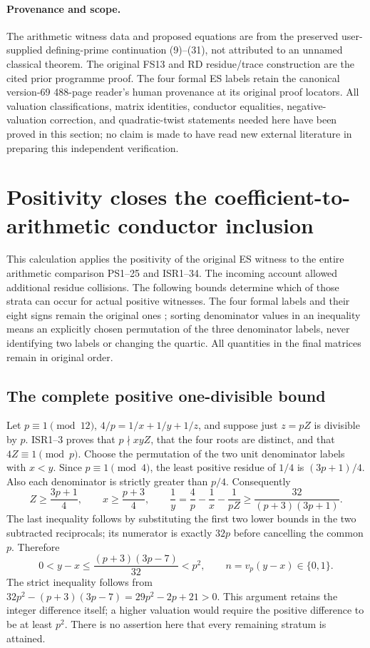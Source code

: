 \documentclass[11pt]{article}
\begin{document}
\paragraph{Provenance and scope.}
The arithmetic witness data and proposed equations are from the
preserved user-supplied defining-prime continuation (9)--(31), not
attributed to an unnamed classical theorem. The original FS13 and
RD residue/trace construction are the cited prior programme proof.
The four formal ES labels retain the canonical version-69 488-page
reader's human provenance at its original proof locators. All
valuation classifications, matrix identities, conductor equalities,
negative-valuation correction, and quadratic-twist statements needed
here have been proved in this section; no claim is made to have read
new external literature in preparing this independent verification.

\section{Positivity closes the coefficient-to-arithmetic conductor inclusion}
This calculation applies the positivity of the original ES witness to the
entire arithmetic comparison PS1--25 and ISR1--34. The incoming account
\cite[eqs.\ (9)--(23)]{DefiningPrimeReceived} allowed additional residue
collisions. The following bounds determine which of those strata can
occur for actual positive witnesses. The four formal labels and their
eight signs remain the original ones \cite{ES488}; sorting denominator
values in an inequality means an explicitly chosen permutation of the
three denominator labels, never identifying two labels or changing the
quartic. All quantities in the final matrices remain in original order.

\subsection{The complete positive one-divisible bound}
Let $p\equiv1\pmod{12}$, $4/p=1/x+1/y+1/z$, and suppose just $z=pZ$
is divisible by $p$. ISR1--3 proves that $p\nmid xyZ$, that the four
roots are distinct, and that $4Z\equiv1\pmod p$. Choose the permutation
of the two unit denominator labels with $x<y$. Since $p\equiv1\pmod4$,
the least positive residue of $1/4$ is $(3p+1)/4$. Also each denominator
is strictly greater than $p/4$. Consequently
\[
 Z\ge\frac{3p+1}{4},\qquad x\ge\frac{p+3}{4},\qquad
 \frac1y=\frac4p-\frac1x-\frac1{pZ}
 \ge\frac{32}{(p+3)(3p+1)}.
 \tag{PB1}
\]
The last inequality follows by substituting the first two lower bounds
in the two subtracted reciprocals; its numerator is exactly $32p$ before
cancelling the common $p$. Therefore
\[
 0<y-x\le\frac{(p+3)(3p-7)}{32}<p^2,
 \qquad n=v_p(y-x)\in\{0,1\}.
 \tag{PB2}
\]
The strict inequality follows from
$32p^2-(p+3)(3p-7)=29p^2-2p+21>0$.
This argument retains the integer difference itself; a higher valuation
would require the positive difference to be at least $p^2$.
There is no assertion here that every remaining stratum is attained.
\end{document}
